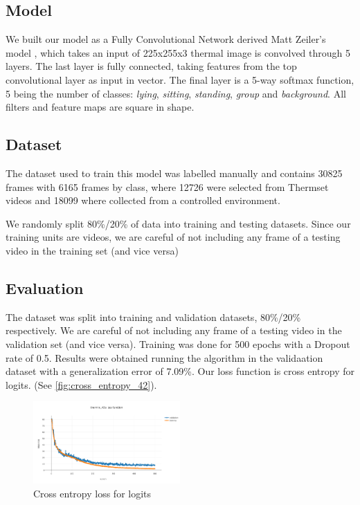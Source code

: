 \documentclass[oneside, twocolumn]{article}
\begin{document}
\subsection{Model}

We built our model as a Fully Convolutional Network derived Matt Zeiler's model \cite{zeiler-2014}, which takes an input of 225x255x3 thermal image is convolved through 5 layers. The last layer is fully connected, taking features from the top convolutional layer as input in vector. The final layer is a 5-way softmax function, 5 being the number of classes: \textit{lying}, \textit{sitting}, \textit{standing}, \textit{group} and \textit{background}. All filters and feature maps are square in shape.

\subsection{Dataset}
The dataset used to train this model was labelled manually and contains 30825 frames with 6165 frames by class, where 12726 were selected from Thermset videos and 18099 where collected from a controlled environment.

We randomly split 80\%/20\% of data into training and testing datasets. Since our training units are videos, we are careful of not including any frame of a testing video in the training set (and vice versa)

\subsection{Evaluation}
The dataset was split into training and validation datasets,  80\%/20\% respectively. We are careful of not including any frame of a testing video in the validation set (and vice versa). Training was done for 500 epochs with a Dropout rate of 0.5. Results were obtained running the algorithm in the validaation dataset with a generalization error of  7.09\%. Our loss function is cross entropy for logits. (See \autoref{fig:cross_entropy_42}).

\begin{figure}
  \centering
    \includegraphics[width=0.5\textwidth]{images/loss_42.png}
  \caption{Cross entropy loss for logits}
  \label{fig:cross_entropy_42}
\end{figure}
\end{document}
